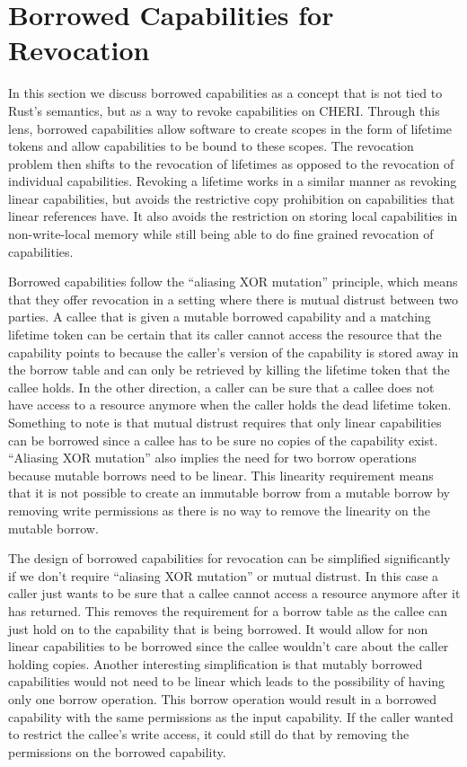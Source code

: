 \section{Borrowed Capabilities for Revocation}
In this section we discuss borrowed capabilities as a concept that is not tied to Rust's semantics, but as a way to revoke capabilities on CHERI.
Through this lens, borrowed capabilities allow software to create scopes in the form of lifetime tokens and allow capabilities to be bound to these scopes.
The revocation problem then shifts to the revocation of lifetimes as opposed to the revocation of individual capabilities.
Revoking a lifetime works in a similar manner as revoking linear capabilities, but avoids the restrictive copy prohibition on capabilities that linear references have.
It also avoids the restriction on storing local capabilities in non-write-local memory while still being able to do fine grained revocation of capabilities.

Borrowed capabilities follow the ``aliasing XOR mutation'' principle, which means that they offer revocation in a setting where there is mutual distrust between two parties.
A callee that is given a mutable borrowed capability and a matching lifetime token can be certain that its caller cannot access the resource that the capability points to because the caller's version of the capability is stored away in the borrow table and can only be retrieved by killing the lifetime token that the callee holds.
In the other direction, a caller can be sure that a callee does not have access to a resource anymore when the caller holds the dead lifetime token.
Something to note is that mutual distrust requires that only linear capabilities can be borrowed since a callee has to be sure no copies of the capability exist.
``Aliasing XOR mutation'' also implies the need for two borrow operations because mutable borrows need to be linear.
This linearity requirement means that it is not possible to create an immutable borrow from a mutable borrow by removing write permissions as there is no way to remove the linearity on the mutable borrow.

The design of borrowed capabilities for revocation can be simplified significantly if we don't require ``aliasing XOR mutation'' or mutual distrust.
In this case a caller just wants to be sure that a callee cannot access a resource anymore after it has returned.
This removes the requirement for a borrow table as the callee can just hold on to the capability that is being borrowed.
It would allow for non linear capabilities to be borrowed since the callee wouldn't care about the caller holding copies.
Another interesting simplification is that mutably borrowed capabilities would not need to be linear which leads to the possibility of having only one borrow operation.
This borrow operation would result in a borrowed capability with the same permissions as the input capability.
If the caller wanted to restrict the callee's write access, it could still do that by removing the permissions on the borrowed capability.

